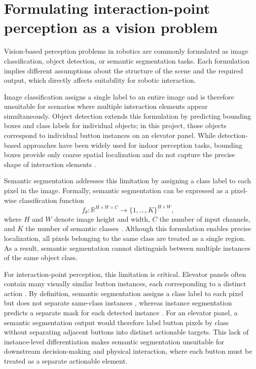 \section{Formulating interaction-point perception as a vision problem}

Vision-based perception problems in robotics are commonly formulated as image
classification, object detection, or semantic segmentation tasks. Each formulation
implies different assumptions about the structure of the scene and the required
output, which directly affects suitability for robotic interaction.

Image classification assigns a single label to an entire image and is therefore
unsuitable for scenarios where multiple interaction elements appear simultaneously.
Object detection extends this formulation by predicting bounding boxes and class
labels for individual objects; in this project, those objects correspond to
individual button instances on an elevator panel. While detection-based approaches have been widely
used for indoor perception tasks, bounding boxes provide only coarse spatial
localization and do not capture the precise shape of interaction elements
\citep{ren2015fasterrcnn,redmon2016yolo}.

Semantic segmentation addresses this limitation by assigning a class label to
each pixel in the image. Formally, semantic segmentation can be expressed as a
pixel-wise classification function
\[
f_{\theta} : \mathbb{R}^{H \times W \times C} \rightarrow \{1,\dots,K\}^{H \times W},
\]
where $H$ and $W$ denote image height and width, $C$ the number of input channels,
and $K$ the number of semantic classes \citep{long2015fcn}. Although this formulation
enables precise localization, all pixels belonging to the same class are treated
as a single region. As a result, semantic segmentation cannot distinguish between
multiple instances of the same object class.

For interaction-point perception, this limitation is critical. Elevator panels
often contain many visually similar button instances, each corresponding to a
distinct action \citep{bernard2020interfaces}. By definition, semantic
segmentation assigns a class label to each pixel but does not separate
same-class instances \citep{long2015fcn}, whereas instance segmentation
predicts a separate mask for each detected instance \citep{he2017maskrcnn}. For an
elevator panel, a semantic segmentation output would therefore label button
pixels by class without separating adjacent buttons into distinct actionable
targets. This lack of instance-level differentiation makes semantic
segmentation unsuitable for downstream decision-making and physical interaction,
where each button must be treated as a separate actionable element.

